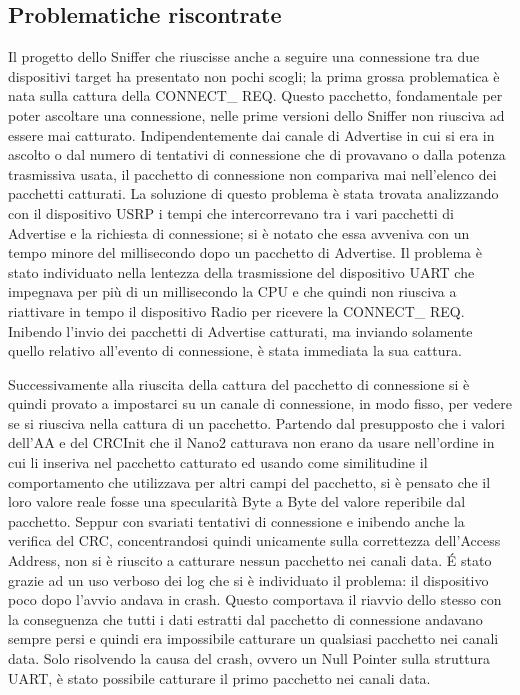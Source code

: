 \subsection{Problematiche riscontrate}
Il progetto dello Sniffer che riuscisse anche a seguire una connessione tra due dispositivi target ha presentato non pochi scogli; la prima grossa problematica è nata sulla cattura della CONNECT\_ REQ. Questo pacchetto, fondamentale per poter ascoltare una connessione, nelle prime versioni dello Sniffer non riusciva ad essere mai catturato. Indipendentemente dai canale di Advertise in cui si era in ascolto o dal numero di tentativi di connessione che di provavano o dalla potenza trasmissiva usata, il pacchetto di connessione non compariva mai nell'elenco dei pacchetti catturati.
La soluzione di questo problema è stata trovata analizzando con il dispositivo USRP i tempi che intercorrevano tra i vari pacchetti di Advertise e la richiesta di connessione; si è notato che essa avveniva con un tempo minore del millisecondo dopo un pacchetto di Advertise. Il problema è stato individuato nella lentezza della trasmissione del dispositivo UART che impegnava per più di un millisecondo la CPU e che quindi non riusciva a riattivare in tempo il dispositivo Radio per ricevere la CONNECT\_ REQ. Inibendo l'invio dei pacchetti di Advertise catturati, ma inviando solamente quello relativo all'evento di connessione, è stata immediata la sua cattura.

Successivamente alla riuscita della cattura del pacchetto di connessione si è quindi provato a impostarci su un canale di connessione, in modo fisso, per vedere se si riusciva nella cattura di un pacchetto.
Partendo dal presupposto che i valori dell'AA e del CRCInit che il Nano2 catturava non erano da usare nell'ordine in cui li inseriva nel pacchetto catturato ed usando come similitudine il comportamento che utilizzava per altri campi del pacchetto, si è pensato che il loro valore reale fosse una specularità Byte a Byte del valore reperibile dal pacchetto. Seppur con svariati tentativi di connessione e inibendo anche la verifica del CRC, concentrandosi quindi unicamente sulla correttezza dell'Access Address, non si è riuscito a catturare nessun pacchetto nei canali data. \'E stato grazie ad un uso verboso dei log che si è individuato il problema: il dispositivo poco dopo l'avvio andava in crash. Questo comportava il riavvio dello stesso con la conseguenza che tutti i dati estratti dal pacchetto di connessione andavano sempre persi e quindi era impossibile catturare un qualsiasi pacchetto nei canali data. Solo risolvendo la causa del crash, ovvero un Null Pointer sulla struttura UART, è stato possibile catturare il primo pacchetto nei canali data.
